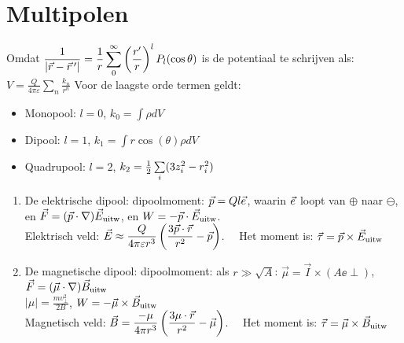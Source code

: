 \section{Multipolen}
Omdat
$\displaystyle
\frac{1}{|\vec{r}-\vec{r}\,'|}=\frac{1}{r}\sum_0^\infty\left(\frac{r'}{r}\right)^lP_l(\cos\theta)
$ is de potentiaal te schrijven als:
$\displaystyle V=\frac{Q}{4\pi\varepsilon}\sum_n\frac{k_n}{r^n}$
\npar
Voor de laagste orde termen geldt:
\begin{itemize}
\item Monopool: $l=0$, $k_0=\int\rho dV$
\item Dipool: $l=1$, $k_1=\int r\cos(\theta)\rho dV$
\item Quadrupool: $l=2$, $k_2=\mbox{$\frac{1}{2}$}\sum\limits_i(3z^2_i-r^2_i)$
\end{itemize}
\begin{enumerate}
\item De elektrische dipool: dipoolmoment: $\vec{p}=Ql\vec{e}_{\rm }$, waarin $\vec{e}_{\rm }$
      loopt van $\oplus$ naar $\ominus$, en\linebreak
      $\vec{F}=(\vec{p}\cdot\nabla)\vec{E}_{\rm uitw}$, en
      $W=-\vec{p}\cdot\vec{E}_{\rm uitw}$.\\
      Elektrisch veld: $\displaystyle \vec{E}\approx\frac{Q}{4\pi\varepsilon r^3}\left(\frac{3\vec{p}\cdot\vec{r}}{r^2}-\vec{p}\right)$.~~
      Het moment is: $\vec{\tau}=\vec{p}\times\vec{E}_{\rm uitw}$
\item De magnetische dipool: dipoolmoment: als $r\gg\sqrt{A}$: $\vec{\mu}=\vec{I}\times(A\ee{\perp})$,
      $\vec{F}=(\vec{\mu}\cdot\nabla)\vec{B}_{\rm uitw}$\\
      $\displaystyle|\mu|=\frac{mv^2_\perp}{2B}$, $W=-\vec{\mu}\times\vec{B}_{\rm uitw}$\\
      Magnetisch veld: $\displaystyle\vec{B}=\frac{-\mu}{4\pi r^3}\left(\frac{3\mu\cdot\vec{r}}{r^2}-\vec{\mu}\right)$.~~
      Het moment is: $\vec{\tau}=\vec{\mu}\times\vec{B}_{\rm uitw}$
\end{enumerate}

